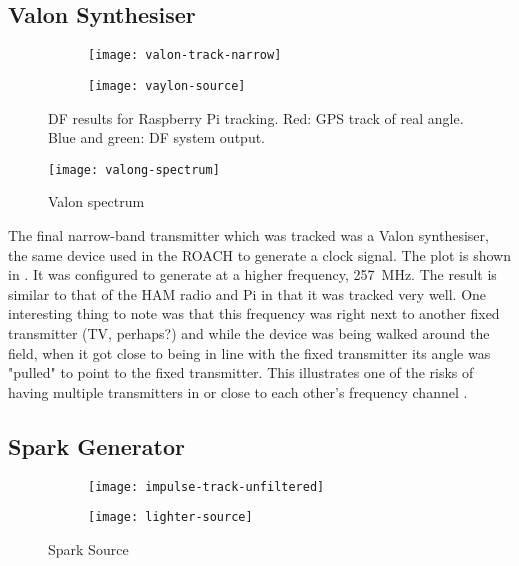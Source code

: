 \subsection{Valon Synthesiser}
\begin{figure}
  \centering
  \begin{subfigure}[b]{0.77\textwidth}
    \centering
    \texttt{[image: valon-track-narrow]}
  \end{subfigure}
  \begin{subfigure}[b]{0.22\textwidth}
    \centering
    \texttt{[image: vaylon-source]}
    \vspace{2em}
  \end{subfigure}
  \caption{DF results for Raspberry Pi tracking. Red: GPS track of real angle. Blue and green: DF system output.}
  \label{fig:field-trials:valon-source}
\end{figure}
\begin{figure}
  \centering
  \texttt{[image: valong-spectrum]}
  \caption{Valon spectrum}
  \label{fig:field-trails-valon-spectrum}
\end{figure}

The final narrow-band transmitter which was tracked was a Valon synthesiser, the same device used in the ROACH to generate a clock signal. The plot is shown in . It was configured to generate at a higher frequency, \SI{257}{\mega\hertz}. The result is similar to that of the HAM radio and Pi in that it was tracked very well. One interesting thing to note was that this frequency was right next to another fixed transmitter (TV, perhaps?) and while the device was being walked around the field, when it got close to being in line with the fixed transmitter its angle was "pulled" to point to the fixed transmitter. This illustrates one of the risks of having multiple transmitters in or close to each other's frequency channel .

\subsection{Spark Generator}

\begin{figure}
  \centering
  \begin{subfigure}[b]{0.82\textwidth}
    \centering
    \texttt{[image: impulse-track-unfiltered]}
  \end{subfigure}
  \begin{subfigure}[b]{0.17\textwidth}
    \centering
    \texttt{[image: lighter-source]}
  \end{subfigure}
  \caption{Spark Source}
  \label{fig:field-trials:impulse-source}
\end{figure}

